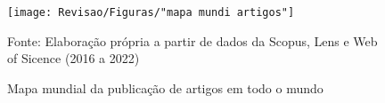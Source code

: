 \begin{figure}[htp!]
	\centering
	\caption{Mapa mundial da publicação de artigos em todo o mundo}
	\label{fig:mapa-mundi-artigos}
	\texttt{[image: Revisao/Figuras/"mapa mundi artigos"]}
	\vspace{0.2cm}
	
	Fonte: Elaboração própria a partir de dados da Scopus, Lens e Web of Sicence (2016 a 2022)
\end{figure}